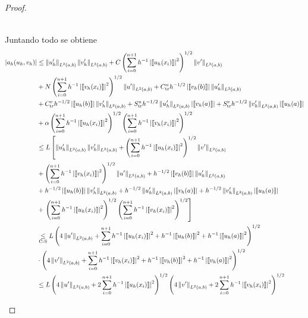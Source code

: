 \documentclass[10pt,a4paper]{report}
\providecommand{\abs}[1]{\left\lvert#1\right\rvert}
\providecommand{\norm}[1]{\left\lVert#1\right\rVert}
\providecommand{\salto}[1]{\left\llbracket#1\right\rrbracket}
\begin{document}
\begin{proof}
\begin{itemize}
\begin{itemize}
\begin{align*}
                \end{align*}
    	    \end{itemize}
            Juntando todo se obtiene
            \begin{align*}
            	\abs{a_{h}(u_{h},v_{h})}&\leq \norm{u'_{h}}_{L^{2}(a,b)}\norm{v'_{h}}_{L^{2}(a,b)} + C\left(\sum_{i=0}^{n+1}h^{-1}\abs{\salto{u_{h}(x_{i})}}^{2}\right)^{1/2}\norm{v'}_{L^{2}(a,b)}\\ &+ N\left(\sum_{i=0}^{n+1}h^{-1}\abs{\salto{v_{h}(x_{i})}}^{2}\right)^{1/2}\norm{u'}_{L^{2}(a,b)} + C^{u}_{\textup{tr}}h^{-1/2}\abs{\salto{v_{h}(b)}}\norm{u'_{h}}_{L^{2}(a,b)}\\ &+ C^{v}_{\textup{tr}}h^{-1/2}\abs{\salto{u_{h}(b)}}\norm{v'_{h}}_{L^{2}(a,b)} + S^{u}_{\textup{tr}}h^{-1/2}\norm{u'_{h}}_{L^{2}(a,b)}\abs{\salto{v_{h}(a)}} + S^{v}_{\textup{tr}}h^{-1/2}\norm{v'_{h}}_{L^{2}(a,b)}\abs{\salto{u_{h}(a)}}\\
            	&+\alpha\left(\sum_{i=0}^{n+1} h^{-1}\abs{\salto{u_{h}(x_{i})}}^{2}\right)^{1/2}\left(\sum_{i=0}^{n+1} h^{-1}\abs{\salto{v_{h}(x_{i})}}^{2}\right)^{1/2}\\
            	&\leq L\left[\norm{u'_{h}}_{L^{2}(a,b)}\norm{v'_{h}}_{L^{2}(a,b)} + \left(\sum_{i=0}^{n+1}h^{-1}\abs{\salto{u_{h}(x_{i})}}^{2}\right)^{1/2}\norm{v'}_{L^{2}(a,b)}\right.\\ &+ \left(\sum_{i=0}^{n+1}h^{-1}\abs{\salto{v_{h}(x_{i})}}^{2}\right)^{1/2}\norm{u'}_{L^{2}(a,b)} + h^{-1/2}\abs{\salto{v_{h}(b)}}\norm{u'_{h}}_{L^{2}(a,b)}\\ &+ h^{-1/2}\abs{\salto{u_{h}(b)}}\norm{v'_{h}}_{L^{2}(a,b)} + h^{-1/2}\norm{u'_{h}}_{L^{2}(a,b)}\abs{\salto{v_{h}(a)}} + h^{-1/2}\norm{v'_{h}}_{L^{2}(a,b)}\abs{\salto{u_{h}(a)}}\\
            	&+\left.\left(\sum_{i=0}^{n+1} h^{-1}\abs{\salto{u_{h}(x_{i})}}^{2}\right)^{1/2}\left(\sum_{i=0}^{n+1} h^{-1}\abs{\salto{v_{h}(x_{i})}}^{2}\right)^{1/2} \right]\\
            	&\underset{\textup{C-S}}{\leq}  L \left(4\norm{u'}_{L^{2}(a,b)} + \sum_{i=0}^{n+1}h^{-1}\abs{\salto{u_{h}(x_{i})}}^{2} + h^{-1}\abs{\salto{u_{h}(b)}}^{2} + h^{-1}\abs{\salto{u_{h}(a)}}^{2}\right)^{1/2}\\ &\cdot\left(4\norm{v'}_{L^{2}(a,b)} + \sum_{i=0}^{n+1}h^{-1}\abs{\salto{v_{h}(x_{i})}}^{2}+ h^{-1}\abs{\salto{v_{h}(b)}}^{2} + h^{-1}\abs{\salto{v_{h}(a)}}^{2}\right)^{1/2}\\
            	&\leq L \left(4\norm{u'}_{L^{2}(a,b)} + 2\sum_{i=0}^{n+1}h^{-1}\abs{\salto{u_{h}(x_{i})}}^{2} \right)^{1/2} \left(4\norm{v'}_{L^{2}(a,b)} + 2\sum_{i=0}^{n+1}h^{-1}\abs{\salto{v_{h}(x_{i})}}^{2}\right)^{1/2}\\

\end{align*}
\end{itemize}
\end{proof}
\end{document}
